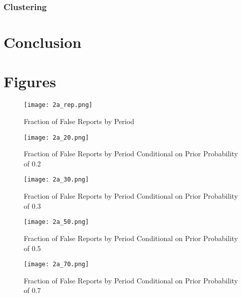 \documentclass[12pt,a4paper]{article}
\begin{document}
	
	\subsubsection{Clustering}
	
	
	\section{Conclusion}
	
	
	
	
	\newpage
	
	
	
	\newpage
	\section{Figures}
	
	\begin{figure}
		\centering
		\texttt{[image: 2a\_rep.png]}
		\caption{Fraction of False Reports by Period} \label{tab:R1}
		\label{fig:enter-label}
	\end{figure}
	
	\begin{figure}
		\centering
		\texttt{[image: 2a\_20.png]}
		\caption{Fraction of False Reports by Period Conditional on Prior Probability of 0.2} \label{tab:F2}
		\label{fig:enter-label}
	\end{figure}
	
	\begin{figure}
		\centering
		\texttt{[image: 2a\_30.png]}
		\caption{Fraction of False Reports by Period Conditional on Prior Probability of 0.3} \label{tab:F3}
		\label{fig:enter-label}
	\end{figure}
	
	\begin{figure}
		\centering
		\texttt{[image: 2a\_50.png]}
		\caption{Fraction of False Reports by Period Conditional on Prior Probability of 0.5} \label{tab:F4}
		\label{fig:enter-label}
	\end{figure}
	
	\begin{figure}
		\centering
		\texttt{[image: 2a\_70.png]}
		\caption{Fraction of False Reports by Period Conditional on Prior Probability of 0.7} \label{tab:F5}
		\label{fig:enter-label}
	\end{figure}
	
\end{document}
